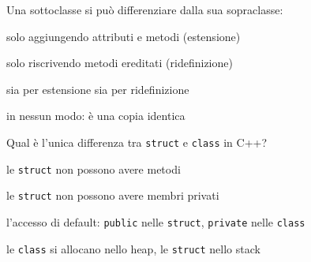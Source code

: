 \begin{quiz}{Una sottoclasse si può differenziare dalla sua sopraclasse:}
  \item solo aggiungendo attributi e metodi (estensione)
  \item solo riscrivendo metodi ereditati (ridefinizione)
  \item sia per estensione sia per ridefinizione
  \item in nessun modo: è una copia identica
\end{quiz}

\begin{quiz}{Qual è l'unica differenza tra \texttt{struct} e \texttt{class} in C++?}
  \item le \texttt{struct} non possono avere metodi
  \item le \texttt{struct} non possono avere membri privati
  \item l'accesso di default: \texttt{public} nelle \texttt{struct}, \texttt{private} nelle \texttt{class}
  \item le \texttt{class} si allocano nello heap, le \texttt{struct} nello stack
\end{quiz}

